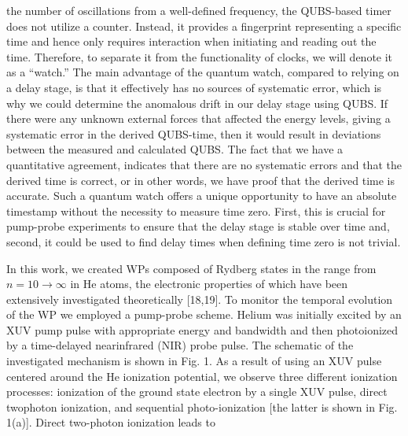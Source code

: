 \documentclass[7pt]{article}
\begin{document}
\begin{multicols}{2}
\small{}
the number of oscillations from a well-defined frequency, the QUBS-based timer does not utilize a counter. Instead, it provides a fingerprint representing a specific time and hence only requires interaction when initiating and reading out the time. Therefore, to separate it from the functionality of clocks, we will denote it as a “watch.” The main advantage of the quantum watch, compared to relying on a delay stage, is
that it effectively has no sources of systematic error, which is why we could determine the anomalous drift in our delay stage using QUBS. If there were any unknown external forces that affected the energy levels, giving a systematic error in the derived QUBS-time, then it would result in deviations between the measured and calculated QUBS. The fact that we have a quantitative agreement, indicates that there are no systematic errors and that the derived time is correct, or in other words, we have proof that the derived time is accurate. Such a quantum watch offers a unique opportunity to have an absolute timestamp without the necessity to measure time zero. First, this is crucial for pump-probe experiments to ensure that the delay stage is stable over time and, second, it could be used to find delay times when defining time zero is
not trivial. 

In this work, we created WPs composed of Rydberg states in the range from $n = 10 \longrightarrow \infty$ in He atoms, the electronic properties of which have been extensively investigated theoretically [18,19]. To monitor the temporal evolution of the WP we employed a pump-probe scheme. Helium was initially excited by an XUV pump pulse with appropriate energy and bandwidth and then photoionized by a time-delayed nearinfrared (NIR) probe pulse. The schematic of the investigated mechanism is shown in Fig. 1. As a result of using an XUV pulse centered around the He ionization potential, we observe three different ionization processes: ionization of the ground state electron by a single XUV pulse, direct twophoton ionization, and sequential photo-ionization [the latter is shown in Fig. 1(a)]. Direct two-photon ionization leads to




\end{multicols}
\end{document}
